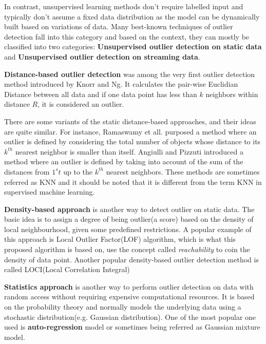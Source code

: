 \documentclass[11pt]{article}       %
\begin{document}
In contrast, unsupervised learning methods don't require labelled input and typically don't assume a fixed data distribution as the model can be dynamically built based on variations of data. Many best-known techniques of outlier detection fall into this category and based on the context, they can mostly be classified into two categories: \textbf{Unsupervised outlier detection on static data} and \textbf{Unsupervised outlier detection on streaming data}. 

\textbf{Distance-based outlier detection} was among the very first outlier detection method introduced by Knorr and Ng\cite{EKnorr:1998}. It calculates the pair-wise Euclidian Distance between all data and if one data point has less than $k$ neighbors within distance $R$, it is considered an outlier. 

There are some variants of the static distance-based approaches, and their ideas are quite similar. For instance, Ramaswamy et all.\cite{Ramaswamy:2000:EAM:342009.335437} purposed a method where an outlier is defined by considering the total number of objects whose distance to its $k^{th}$ nearest neighbor is smaller than itself. Angiulli and Pizzuti\cite{1377172} introduced a method where an outlier is defined by taking into account of the sum of the distances from $1^st$ up to the $k^{th}$ nearest neighbors. These methods are sometimes referred as KNN and it should be noted that it is different from the term KNN in supervised machine learning. 

\textbf{Density-based approach} is another way to detect outlier on static data. The basic idea is to assign a degree of being outlier(a score) based on the density of local neighbourhood, given some predefined restrictions. A popular example of this approach is Local Outlier Factor(LOF) algorithm\cite{Breunig:2000:LID:342009.335388}, which is what this proposed algorithm is based on, use the concept called \textit{reachability} to coin the density of data point. Another popular density-based outlier detection method is called LOCI(Local Correlation Integral)\cite{1260802}

\textbf{Statistics approach} is another way to perform outlier detection on data with random access without requiring expensive computational resources. It is based on the probability theory and normally models the underlying data using a stochastic distribution(e.g. Gaussian distribution). One of the most popular one used is \textbf{auto-regression} model or sometimes being referred as Gaussian mixture model\cite{4438332}.
\end{document}
